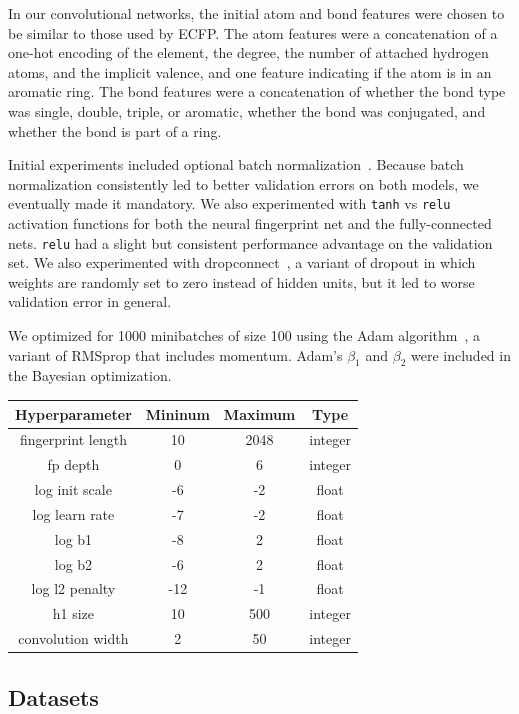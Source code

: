 \documentclass{article}
\begin{document}
In our convolutional networks, the initial atom and bond features were chosen to be similar to those used by ECFP.
The atom features were a concatenation of a one-hot encoding of the element, the degree, the number of attached hydrogen atoms, and the implicit valence, and one feature indicating if the atom is in an aromatic ring. 
The bond features were a concatenation of whether the bond type was single, double, triple, or aromatic, whether the bond was conjugated, and whether the bond is part of a ring.

Initial experiments included optional batch normalization~\citep{ioffe2015batch}.
Because batch normalization consistently led to better validation errors on both models, we eventually made it mandatory.
We also experimented with \texttt{tanh} vs \texttt{relu} activation functions for both the neural fingerprint net and the fully-connected nets.  \texttt{relu} had a slight but consistent performance advantage on the validation set.
We also experimented with dropconnect~\citep{wan2013regularization}, a variant of dropout in which weights are randomly set to zero instead of hidden units, but it led to worse validation error in general.

We optimized for 1000 minibatches of size 100 using the Adam algorithm~\citep{Adam14}, a variant of RMSprop that includes momentum.
Adam's $\beta_1$ and $\beta_2$ were included in the Bayesian optimization.

\begin{table}
\center
\begin{tabular}{c|ccc}
Hyperparameter & Mininum & Maximum & Type \\
\hline
fingerprint length & 10   &   2048  & integer \\
fp depth  & 0 &       6 &     integer \\
log init scale & -6 &      -2 &     float \\
log learn rate & -7 &      -2 &    float \\
log b1 & -8 &      2 &    float \\
log b2 & -6 &     2 &   float \\
log l2 penalty & -12 &     -1 &   float \\
h1 size & 10   &   500  & integer \\
\hline 
convolution width & 2 & 50 & integer
\end{tabular}
\end{table}



\subsection{Datasets}
\end{document}
